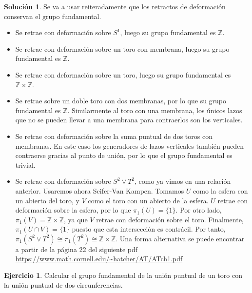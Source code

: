 \documentclass{article}
\theoremstyle{plain}
\theoremstyle{definition}
\newtheorem{exercise}{Ejercicio}
\newtheorem*{sol*}{Solución}
\newcommand{\Z}{\mathbb{Z}}
\begin{document}
\begin{sol*}
Se va a usar reiteradamente que los retractos de deformación conservan el grupo fundamental.
\begin{itemize}
\item Se retrae con deformación sobre $S^1$, luego su grupo fundamental es $\Z$.
\item Se retrae con deformación sobre un toro con membrana, luego su grupo fundamental es $\Z$.
\item Se retrae con deformación sobre un toro, luego su grupo fundamental es $\Z\times\Z$.
\item Se retrae sobre un doble toro con dos membranas, por lo que su grupo fundamental es $\Z$. Similarmente al toro con una membrana, los únicos lazos que no se pueden llevar a una membrana para contraerlos son los verticales.
\item Se retrae con deformación sobre la suma puntual de dos toros con membranas. En este caso los generadores de lazos verticales también pueden contraerse gracias al punto de unión, por lo que el grupo fundamental es trivial.
\item Se retrae con deformación sobre $S^2\vee T^2$, como ya vimos en una relación anterior. Usaremos ahora Seifer-Van Kampen. Tomamos $U$ como la esfera con un abierto del toro, y $V$ como el toro con un abierto de la esfera. $U$ retrae con deformación sobre la esfera, por lo que $\pi_1(U)=\{1\}$. Por otro lado, $\pi_1(V)=\Z\times\Z$, ya que $V$ retrae con deformación sobre el toro. Finalmente, $\pi_1(U\cap V)=\{1\}$ puesto que esta intersección es contrácil. Por tanto, $\pi_1(S^2\vee T^2)\cong\pi_1(T^2)\cong\Z\times\Z$. Una forma alternativa se puede encontrar a partir de la página 22 del siguiente pdf \url{https://www.math.cornell.edu/~hatcher/AT/ATch1.pdf}
\end{itemize}
\end{sol*}

\newpage

\begin{exercise}

Calcular el grupo fundamental de la uni\'on puntual de un toro con la uni\'on puntual de dos circunferencias.



\end{exercise}
\end{document}
